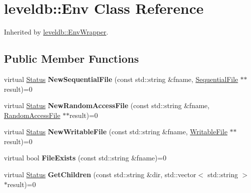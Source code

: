 \hypertarget{classleveldb_1_1_env}{}\section{leveldb\+::Env Class Reference}
\label{classleveldb_1_1_env}


Inherited by \mbox{\hyperlink{classleveldb_1_1_env_wrapper}{leveldb\+::\+Env\+Wrapper}}.

\subsection*{Public Member Functions}
\begin{DoxyCompactItemize}
\item 
\mbox{\label{classleveldb_1_1_env_ad73810059f48c1d7b91125d357e7d351}} 
virtual \mbox{\hyperlink{classleveldb_1_1_status}{Status}} {\bfseries New\+Sequential\+File} (const std\+::string \&fname, \mbox{\hyperlink{classleveldb_1_1_sequential_file}{Sequential\+File}} $\ast$$\ast$result)=0
\item 
\mbox{\label{classleveldb_1_1_env_a1df3e0bb2d47ee914448df9bb9ca0734}} 
virtual \mbox{\hyperlink{classleveldb_1_1_status}{Status}} {\bfseries New\+Random\+Access\+File} (const std\+::string \&fname, \mbox{\hyperlink{classleveldb_1_1_random_access_file}{Random\+Access\+File}} $\ast$$\ast$result)=0
\item 
\mbox{\label{classleveldb_1_1_env_a4566194f3e82fede425fdb5bb355f7de}} 
virtual \mbox{\hyperlink{classleveldb_1_1_status}{Status}} {\bfseries New\+Writable\+File} (const std\+::string \&fname, \mbox{\hyperlink{classleveldb_1_1_writable_file}{Writable\+File}} $\ast$$\ast$result)=0
\item 
\mbox{\label{classleveldb_1_1_env_acbb85047fdf7bf441bd365cfb09f9ecb}} 
virtual bool {\bfseries File\+Exists} (const std\+::string \&fname)=0
\item 
\mbox{\label{classleveldb_1_1_env_a53028e3112d7bb3bf6574ddaab18d6f6}} 
virtual \mbox{\hyperlink{classleveldb_1_1_status}{Status}} {\bfseries Get\+Children} (const std\+::string \&dir, std\+::vector$<$ std\+::string $>$ $\ast$result)=0
\item 
\mbox{\label{classleveldb_1_1_env_ac956b984466d5f09309664177687f9af}} 
$$
\end{DoxyCompactItemize}
